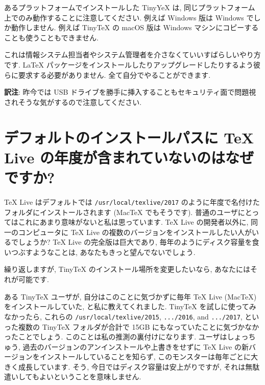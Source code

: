 \documentclass[
  xelatex,ja=standard,jafont=noto]{bxjsreport}
\begin{document}
あるプラットフォームでインストールした TinyYeX は,
同じプラットフォーム上でのみ動作することに注意してください. 例えば
Windows 版は Windows でしか動作しません. 例えば TinyTeX の macOS 版は
Windows マシンにコピーすることも使うこともできません.

これは情報システム担当者やシステム管理者を介さなくていいすばらしいやり方です.
LaTeX
パッケージをインストールしたりアップグレードしたりするよう彼らに要求する必要がありません.
全て自分でやることができます.

\textbf{訳注}: 昨今では USB
ドライブを勝手に挿入することもセキュリティ面で問題視されそうな気がするので注意してください.

\hypertarget{ux30c7ux30d5ux30a9ux30ebux30c8ux306eux30a4ux30f3ux30b9ux30c8ux30fcux30ebux30d1ux30b9ux306b-tex-live-ux306eux5e74ux5ea6ux304cux542bux307eux308cux3066ux3044ux306aux3044ux306eux306fux306aux305cux3067ux3059ux304b}{%
\section{デフォルトのインストールパスに TeX Live
の年度が含まれていないのはなぜですか?}\label{ux30c7ux30d5ux30a9ux30ebux30c8ux306eux30a4ux30f3ux30b9ux30c8ux30fcux30ebux30d1ux30b9ux306b-tex-live-ux306eux5e74ux5ea6ux304cux542bux307eux308cux3066ux3044ux306aux3044ux306eux306fux306aux305cux3067ux3059ux304b}}

TeX Live はデフォルトでは \texttt{/usr/local/texlive/2017}
のように年度で名付けたフォルダにインストールされます (MacTeX
でもそうです).
普通のユーザにとってはこれにあまり意味がないと私は思っています. TeX Live
の開発者以外に, 同一のコンピュータに TeX Live
の複数のバージョンをインストールしたい人がいるでしょうか? TeX Live
の完全版は巨大であり, 毎年のようにディスク容量を食いつぶすようなことは,
あなたもきっと望んでないでしょう.

繰り返しますが, TinyTeX のインストール場所を変更したいなら,
あなたにはそれが可能です.

ある TinyTeX ユーザが, 自分はこのことに気づかずに毎年 TeX Live (MacTeX)
をインストールしていた, と私に教えてくれました. TinyTeX
を試しに使ってみなかったら, これらの \texttt{/usr/local/texlive/2015},
\texttt{.../2016}, and \texttt{.../2017}, といった複数の TinyTeX
フォルダが合計で 15GB にもなっていたことに気づかなかったことでしょう.
このことは私の推測の裏付けになります. ユーザはしょっちゅう,
過去のバージョンのアンインストールや上書きをせずに TeX Live
の新バージョンをインストールしていることを知らず,
このモンスターは毎年ごとに大きく成長しています. そう,
今日ではディスク容量は安上がりですが,
それは無駄遣いしてもよいということを意味しません.
\end{document}
